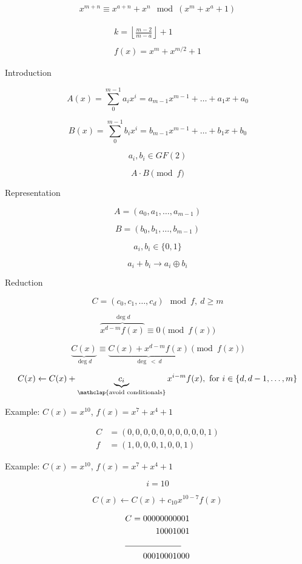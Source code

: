 \begin{gather*}
x^{m+n} \equiv x^{a+n} + x^n \mod (x^m + x^a + 1)
\end{gather*}

\begin{gather*}
k = \left \lfloor \frac{m-2}{m-a} \right \rfloor + 1 \\
\\
f(x) = x^m + x^{m/2} + 1
\end{gather*}


Introduction

$$ A(x) = \sum_{0}^{m-1} a_i x^i = a_{m-1} x^{m-1} + \ldots + a_1 x + a_0 $$

$$ B(x) = \sum_{0}^{m-1} b_i x^i = b_{m-1} x^{m-1} + \ldots + b_1 x + b_0 $$

$$ a_i, b_i \in GF(2) $$

$$ A \cdot B \pmod{f} $$

Representation

$$ A = (a_0, a_1, \ldots, a_{m-1}) $$

$$ B = (b_0, b_1, \ldots, b_{m-1}) $$

$$ a_i, b_i \in \{0, 1\} $$

$$ a_i + b_i \rightarrow a_i \oplus b_i $$


Reduction

$$ C = (c_0, c_1, \ldots, c_{d}) \mod f,~d \geq m $$


$$ \overbrace{x^{d-m} f(x)}^{\deg d} \equiv 0 \pmod{f(x)}$$

$$ \underbrace{C(x)}_{\deg d} \equiv \underbrace{C(x) + x^{d-m} f(x)}_{\deg~<~d} \pmod{f(x)}$$


$$ C(x) \leftarrow C(x) + \underbrace{c_i}_{\mathclap{\text{avoid conditionals}}} x^{i-m} f(x),~\text{for}~i \in \{d, d-1, \ldots, m\} $$



Example: $C(x) = x^{10}$, $f(x) = x^7 + x^4 + 1$

\begin{align*}
C &= (0, 0, 0, 0, 0, 0, 0, 0, 0, 0, 1)  \\
f &= (1, 0, 0, 0, 1, 0, 0, 1)
\end{align*}


Example: $C(x) = x^{10}$, $f(x) = x^7 + x^4 + 1$

$$ i = 10 $$

$$ C(x) \leftarrow C(x) + c_{10} x^{10-7} f(x)$$

\begin{align*}
C = 00000000001 \\
       10001001 \\
\cline{1-2}
    00010001000
\end{align*}


